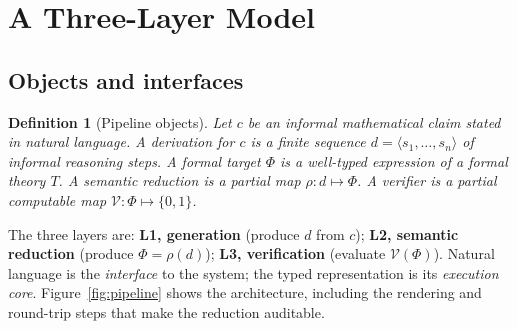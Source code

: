 \documentclass[11pt,a4paper]{article}
\theoremstyle{plain}
\newtheorem{definition}{Definition}
\theoremstyle{remark}
\newcommand{\red}{\rho}                 %
\begin{document}
\section{A Three-Layer Model}
\label{sec:model}

\subsection{Objects and interfaces}

\begin{definition}[Pipeline objects]
Let $c$ be an informal mathematical \emph{claim} stated in natural language.  A
\emph{derivation} for $c$ is a finite sequence
$d=\langle s_1,\dots,s_n\rangle$ of informal reasoning steps.  A
\emph{formal target} $\Phi$ is a well-typed expression of a formal theory $T$.
A \emph{semantic reduction} is a partial map
$\red : d \mapsto \Phi$.  A \emph{verifier} is a partial computable map
$\mathcal{V}: \Phi \mapsto \{0,1\}$.
\end{definition}

The three layers are: \textbf{L1, generation} (produce $d$ from $c$);
\textbf{L2, semantic reduction} (produce $\Phi=\red(d)$); \textbf{L3,
verification} (evaluate $\mathcal{V}(\Phi)$).  Natural language is the
\emph{interface} to the system; the typed representation is its \emph{execution
core}.  Figure~\ref{fig:pipeline} shows the architecture, including the
rendering and round-trip steps that make the reduction auditable.
\end{document}
